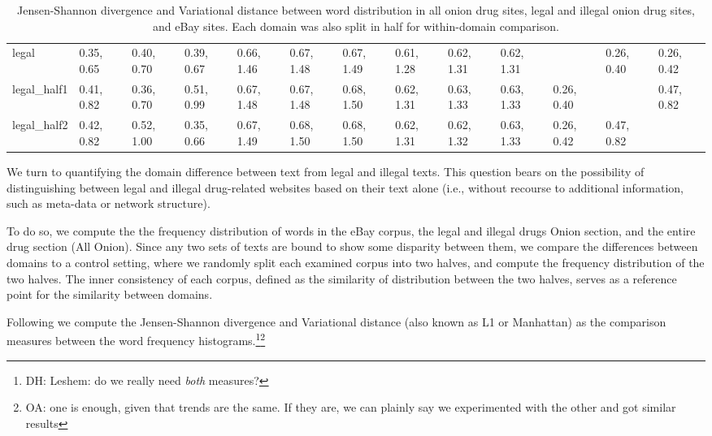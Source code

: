 \documentclass[11pt,a4paper,table]{article}
\newcommand{\oa}[1]{\footnote{\color{red}OA: #1}}
\newcommand{\daniel}[1]{\footnote{\color{brown}DH: #1}}
\begin{document}
\begin{table*}[]
{\begin{tabular}{@{}lllllllllllll@{}}
                legal            & 0.35, 0.65 & 0.40, 0.70       & 0.39, 0.67       & 0.66, 1.46 & 0.67, 1.48  & 0.67, 1.49  & 0.61, 1.28 & 0.62, 1.31     & 0.62, 1.31     &            & 0.26, 0.40   & 0.26, 0.42   \\
                legal\_half1     & 0.41, 0.82 & 0.36, 0.70       & 0.51, 0.99       & 0.67, 1.48 & 0.67, 1.48  & 0.68, 1.50  & 0.62, 1.31 & 0.63, 1.33     & 0.63, 1.33     & 0.26, 0.40 &              & 0.47, 0.82   \\
                legal\_half2     & 0.42, 0.82 & 0.52, 1.00       & 0.35, 0.66       & 0.67, 1.49 & 0.68, 1.50  & 0.68, 1.50  & 0.62, 1.31 & 0.62, 1.32     & 0.63, 1.33     & 0.26, 0.42 & 0.47, 0.82   &             
            \end{tabular}%
        }
        \caption{Jensen-Shannon divergence and Variational distance between word distribution in all onion drug sites, legal and illegal onion drug sites, and eBay sites.
        Each domain was also split in half for within-domain comparison. \label{ta:domain_halves}}
        
    \end{table*}

    We turn to quantifying the domain difference between text from legal and illegal texts. This question bears on the possibility of distinguishing between legal and illegal drug-related websites based on their text alone (i.e., without recourse to additional information, such as meta-data or network structure). 
    
    To do so, we compute the the frequency distribution of words in the eBay corpus, the legal and illegal drugs Onion section, and the entire drug section (All Onion). 
    Since any two sets of texts are bound to show some disparity between them, we compare the differences between domains to a control setting, where we randomly split each examined corpus into two halves, and compute the frequency distribution of the two halves. The inner consistency of each corpus, defined as the similarity of distribution between the two halves, serves as a reference point for the similarity between domains.
    
    Following \citet{Plank2011EffectiveMO} we compute the Jensen-Shannon divergence and Variational distance (also known as L1 or Manhattan) as the comparison measures between the word frequency histograms.\daniel{Leshem: do we really need \textit{both} measures?}\oa{one is enough, given that trends are the same. If they are, we can plainly say we experimented with the other and got similar results}
   
\end{document}
